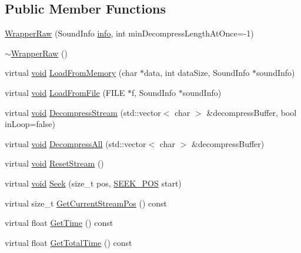 \subsection*{Public Member Functions}
\begin{DoxyCompactItemize}
\item 
\mbox{\hyperlink{classnjli_1_1_wrapper_raw_ad512917755c10182cb00cb0f398e58ff}{Wrapper\+Raw}} (Sound\+Info \mbox{\hyperlink{classnjli_1_1_wrapper_raw_a777c10f85fa37e26f01338e5fa8bf938}{info}}, int min\+Decompress\+Length\+At\+Once=-\/1)
\item 
\mbox{\hyperlink{classnjli_1_1_wrapper_raw_a495e13205f68e27f66c6bcc3ff3ec0b2}{$\sim$\+Wrapper\+Raw}} ()
\item 
virtual \mbox{\hyperlink{_thread_8h_af1e856da2e658414cb2456cb6f7ebc66}{void}} \mbox{\hyperlink{classnjli_1_1_wrapper_raw_aca473a80ec7a02e3df6a74b171c2d1fb}{Load\+From\+Memory}} (char $\ast$data, int data\+Size, Sound\+Info $\ast$sound\+Info)
\item 
virtual \mbox{\hyperlink{_thread_8h_af1e856da2e658414cb2456cb6f7ebc66}{void}} \mbox{\hyperlink{classnjli_1_1_wrapper_raw_a9286adcc339118eac5d143ad73b646a7}{Load\+From\+File}} (F\+I\+LE $\ast$f, Sound\+Info $\ast$sound\+Info)
\item 
virtual \mbox{\hyperlink{_thread_8h_af1e856da2e658414cb2456cb6f7ebc66}{void}} \mbox{\hyperlink{classnjli_1_1_wrapper_raw_a25b25679205b828a096535b40f3082be}{Decompress\+Stream}} (std\+::vector$<$ char $>$ \&decompress\+Buffer, bool in\+Loop=false)
\item 
virtual \mbox{\hyperlink{_thread_8h_af1e856da2e658414cb2456cb6f7ebc66}{void}} \mbox{\hyperlink{classnjli_1_1_wrapper_raw_aa3e0d88a80c5af562903e445ed2a863e}{Decompress\+All}} (std\+::vector$<$ char $>$ \&decompress\+Buffer)
\item 
virtual \mbox{\hyperlink{_thread_8h_af1e856da2e658414cb2456cb6f7ebc66}{void}} \mbox{\hyperlink{classnjli_1_1_wrapper_raw_ab48755f1c7d217737288bfe4c6320c16}{Reset\+Stream}} ()
\item 
virtual \mbox{\hyperlink{_thread_8h_af1e856da2e658414cb2456cb6f7ebc66}{void}} \mbox{\hyperlink{classnjli_1_1_wrapper_raw_a9ffac2e6ec0dca3b9592fba9e29ba3f4}{Seek}} (size\+\_\+t pos, \mbox{\hyperlink{classnjli_1_1_i_sound_file_wrapper_ab4b07720cb2823b4f3f9fa98ee07a6e7}{S\+E\+E\+K\+\_\+\+P\+OS}} start)
\item 
virtual size\+\_\+t \mbox{\hyperlink{classnjli_1_1_wrapper_raw_a66e31271020e3b7e7c48ecda73ed0351}{Get\+Current\+Stream\+Pos}} () const
\item 
virtual float \mbox{\hyperlink{classnjli_1_1_wrapper_raw_a1b236f8ef4b7bffe5b5a68d29c855cf3}{Get\+Time}} () const
\item 
virtual float \mbox{\hyperlink{classnjli_1_1_wrapper_raw_a2aa8be2aa5e292b3375c1a92f007592c}{Get\+Total\+Time}} () const
\end{DoxyCompactItemize}
